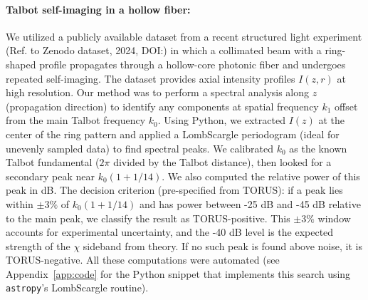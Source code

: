 \documentclass{article}
\begin{document}
\paragraph{Talbot self-imaging in a hollow fiber:} We utilized a publicly available dataset from a recent structured light experiment (Ref. to Zenodo dataset, 2024, DOI:) in which a collimated beam with a ring-shaped profile propagates through a hollow-core photonic fiber and undergoes repeated self-imaging. The dataset provides axial intensity profiles $I(z,r)$ at high resolution. Our method was to perform a spectral analysis along $z$ (propagation direction) to identify any components at spatial frequency $k_1$ offset from the main Talbot frequency $k_0$. Using Python, we extracted $I(z)$ at the center of the ring pattern and applied a LombScargle periodogram (ideal for unevenly sampled data) to find spectral peaks. We calibrated $k_0$ as the known Talbot fundamental ($2\pi$ divided by the Talbot distance), then looked for a secondary peak near $k_0(1+1/14)$. We also computed the relative power of this peak in dB. The decision criterion (pre-specified from TORUS): if a peak lies within $\pm3\%$ of $k_0(1+1/14)$ and has power between -25 dB and -45 dB relative to the main peak, we classify the result as TORUS-positive. This $\pm3\%$ window accounts for experimental uncertainty, and the -40 dB level is the expected strength of the $\chi$ sideband from theory. If no such peak is found above noise, it is TORUS-negative. All these computations were automated (see Appendix~\ref{app:code} for the Python snippet that implements this search using \texttt{astropy}'s LombScargle routine).
\end{document}
